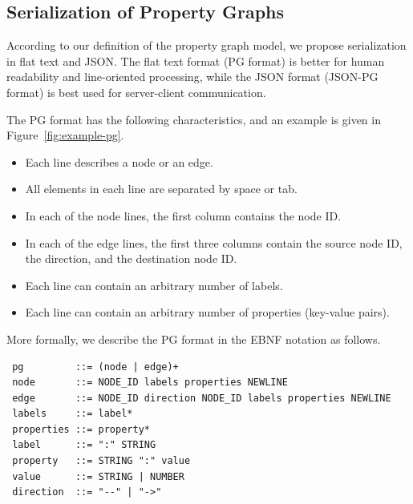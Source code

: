 \documentclass[runningheads]{llncs}
\begin{document}
\subsection{Serialization of Property Graphs}
According to our definition of the property graph model, we propose serialization in flat text and JSON. The flat text format (PG format) is better for human readability and line-oriented processing, while the JSON format (JSON-PG format) is best used for server-client communication.

The PG format has the following characteristics, and an example is given in Figure~\ref{fig:example-pg}.

\begin{itemize}
    \item Each line describes a node or an edge.
    \item All elements in each line are separated by space or tab.
    \item In each of the node lines, the first column contains the node ID.
    \item In each of the edge lines, the first three columns contain the source node ID, the direction, and the destination node ID.
    \item Each line can contain an arbitrary number of labels.
    \item Each line can contain an arbitrary number of properties (key-value pairs).
\end{itemize}

More formally, we describe the PG format in the EBNF notation as follows.

\begin{defi}
\leavevmode
\begin{verbatim}
 pg         ::= (node | edge)+
 node       ::= NODE_ID labels properties NEWLINE
 edge       ::= NODE_ID direction NODE_ID labels properties NEWLINE
 labels     ::= label*
 properties ::= property*
 label      ::= ":" STRING
 property   ::= STRING ":" value
 value      ::= STRING | NUMBER
 direction  ::= "--" | "->"
\end{verbatim}
\end{defi}

\end{document}
